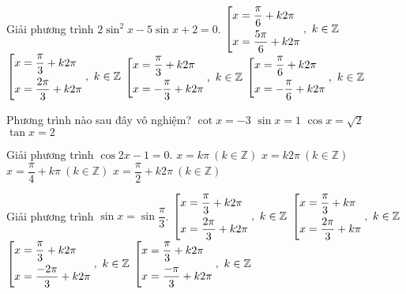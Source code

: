 \begin{ex}%
Giải phương trình $ 2\sin^2 x-5\sin x+2=0 $.
\choice
{\True $ \left[\begin{aligned}& x=\dfrac{\pi}{6}+k2\pi\\ & x=\dfrac{5\pi}{6}+k2\pi\end{aligned}\right.,\ k\in\mathbb{Z} $}
{$ \left[\begin{aligned}& x=\dfrac{\pi}{3}+k2\pi\\ & x=\dfrac{2\pi}{3}+k2\pi\end{aligned}\right.,\ k\in\mathbb{Z} $}
{$ \left[\begin{aligned}& x=\dfrac{\pi}{3}+k2\pi\\ & x=-\dfrac{\pi}{3}+k2\pi\end{aligned}\right.,\ k\in\mathbb{Z} $}
{ $ \left[\begin{aligned}& x=\dfrac{\pi}{6}+k2\pi\\ & x=-\dfrac{\pi}{6}+k2\pi\end{aligned}\right.,\ k\in\mathbb{Z} $}
\end{ex}

\begin{ex}%
Phương trình nào sau đây vô nghiệm?
\choice
{$ \cot x=-3 $}
{$ \sin x=1 $}
{\True $ \cos x=\sqrt{2} $}
{$ \tan x=2 $}
\end{ex}

\begin{ex}%
Giải phương trình $ \cos 2x-1=0 $.
\choice
{\True $ x=k\pi\ (k\in\mathbb{Z}) $}
{$ x=k2\pi\ (k\in\mathbb{Z}) $}
{$ x=\dfrac{\pi}{4}+k\pi\ (k\in\mathbb{Z}) $}
{$ x=\dfrac{\pi}{2}+k2\pi\ (k\in\mathbb{Z}) $}
\end{ex}

\begin{ex}%
Giải phương trình $ \sin x=\sin\dfrac{\pi}{3} $.
\choice
{\True $ \left[\begin{aligned}& x=\dfrac{\pi}{3}+k2\pi\\ & x=\dfrac{2\pi}{3}+k2\pi\end{aligned}\right.,\ k\in\mathbb{Z} $}
{$ \left[\begin{aligned}& x=\dfrac{\pi}{3}+k\pi\\ & x=\dfrac{2\pi}{3}+k\pi\end{aligned}\right.,\ k\in\mathbb{Z} $}
{$ \left[\begin{aligned}& x=\dfrac{\pi}{3}+k2\pi\\ & x=\dfrac{-2\pi}{3}+k2\pi\end{aligned}\right.,\ k\in\mathbb{Z} $}
{$ \left[\begin{aligned}& x=\dfrac{\pi}{3}+k2\pi\\ & x=\dfrac{-\pi}{3}+k2\pi\end{aligned}\right.,\ k\in\mathbb{Z} $}
\end{ex}

